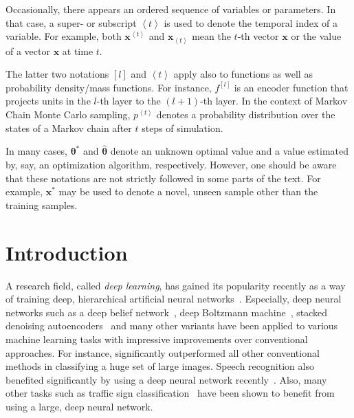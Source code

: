\documentclass{now}
\newcommand{\qt}[1]{\left<#1\right>}
\newcommand{\qlay}[1]{\left[#1\right]}
\newcommand{\vect}[1]{\mathbf{#1}}
\newcommand{\vects}[1]{\boldsymbol{#1}}
\newcommand{\vx}[0]{\vect{x}}
\newcommand{\TT}[0]{{\vects{\theta}}}
\begin{document}
Occasionally, there appears an ordered sequence of variables or parameters. In
that case, a super- or subscript $\qt{t}$ is used to denote the temporal index
of a variable.  For example, both $\vx^{\qt{t}}$ and $\vx_{\qt{t}}$ mean the
$t$-th vector $\vx$ or the value of a vector $\vx$ at time $t$.

The latter two notations $\qlay{l}$ and $\qt{t}$ apply also to functions as
well as probability density/mass functions.  For instance, $f^{\qlay{l}}$ is an
encoder function that projects units in the $l$-th layer to the $(l+1)$-th
layer.  In the context of Markov Chain Monte Carlo sampling, $p^{\qt{t}}$
denotes a probability distribution over the states of a Markov chain after $t$
steps of simulation.

In many cases, $\TT^*$ and $\hat{\TT}$ denote an unknown optimal value and a
value estimated by, say, an optimization algorithm, respectively. However, one
should be aware that these notations are not strictly followed in some parts of
the text. For example, $\vx^*$ may be used to denote a novel, unseen sample
other than the training samples.










\chapter{Introduction}

A research field, called \textit{deep learning}, has gained its popularity
recently as a way of training deep, hierarchical artificial neural
networks~\citep[see, for example,][]{Bengio2009a}.  Especially, deep neural
networks such as a deep belief network~\citep{Hinton2006nc}, deep Boltzmann
machine~\citep{Salakhutdinov2009a}, stacked denoising
autoencoders~\citep{Vincent2010} and many other variants have been applied to
various machine learning tasks with impressive improvements over conventional
approaches.  For instance, \citet{Krizhevsky2012} significantly outperformed all
other conventional methods in classifying a huge set of large images.  Speech
recognition also benefited significantly by using a deep neural network
recently~\citep[see, e.g.,][]{Hinton2012sp}. Also, many other tasks such as
traffic sign classification~\citep{Ciresan2012c} have been shown to benefit from
using a large, deep neural network.
\end{document}

